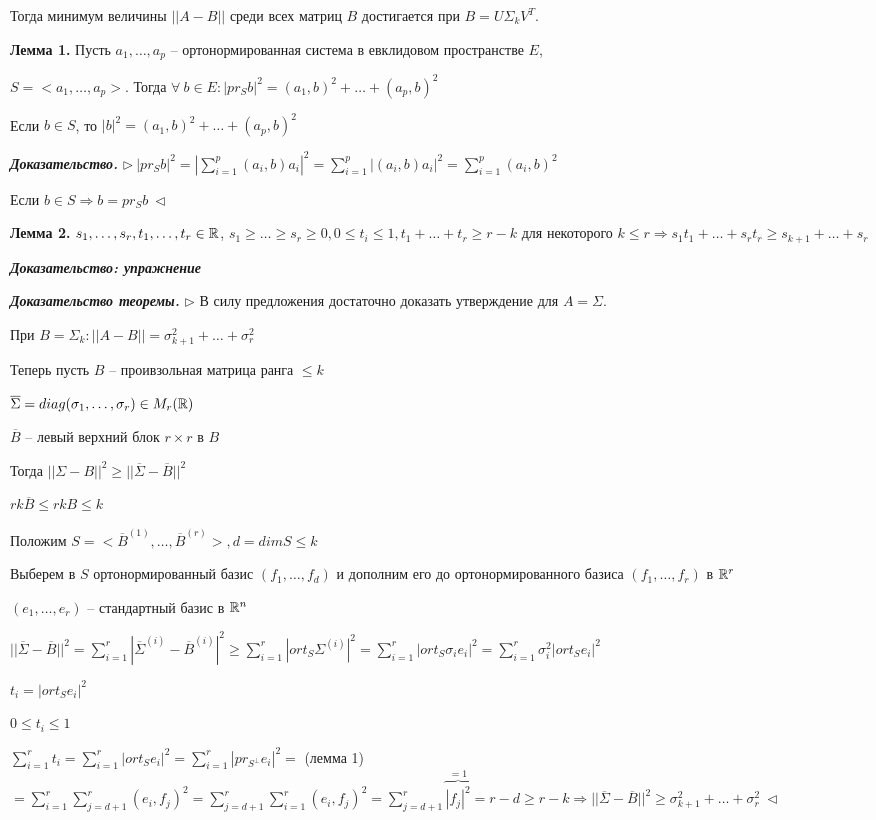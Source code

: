 Тогда минимум величины $||A - B||$ среди всех матриц $B$ достигается при $B = U \Sigma_k V^T$.

\bigskip
\textbf{Лемма 1.} Пусть $a_1, \dots, a_p$ -- ортонормированная система в евклидовом пространстве $E$,

$S = <a_1, \dots, a_p>$. Тогда $\forall \ b \in E: |pr_S b|^2 = (a_1, b)^2 + \dots + (a_p, b)^2$

Если $b \in S$, то $|b|^2 = (a_1, b)^2 + \dots + (a_p, b)^2$

\bigskip
\textbf{\textit{Доказательство.}} $\rhd \ |pr_S b|^2 = |\sum\limits_{i=1}^p (a_i, b) a_i|^2 = \sum\limits_{i=1}^p |(a_i, b) a_i|^2 = \sum\limits_{i=1}^p (a_i, b)^2$

Если $b \in S \Rightarrow b = pr_S b \ \lhd$

\bigskip
\textbf{Лемма 2.} $s_1, \dots, s_r, t_1, \dots, t_r \in \mathbb{R}$, $s_1 \geqslant \dots \geqslant s_r \geqslant 0, 0 \leqslant t_i \leqslant 1, t_1 + \dots + t_r \geqslant r - k$ для некоторого $k \leqslant r \Rightarrow s_1 t_1 + \dots + s_r t_r \geqslant s_{k+1} + \dots + s_r$

\bigskip
\textbf{\textit{Доказательство: упражнение}}

\bigskip
\textbf{\textit{Доказательство теоремы.}} $\rhd$ В силу предложения достаточно доказать утверждение для $A = \Sigma$.

При $B = \Sigma_k: ||A - B|| = \sigma_{k+1}^2 + \dots + \sigma_r^2$

\bigskip
Теперь пусть $B$ -- проивзольная матрица ранга $\leqslant k$

$\overline{\Sigma} = diag(\sigma_1, \dots, \sigma_r) \in M_r (\mathbb{R})$

$\overline{B}$ -- левый верхний блок $r \times r$ в $B$

\bigskip
Тогда $||\Sigma - B||^2 \geqslant ||\overline{\Sigma} - \overline{B}||^2$

$rk \overline{B} \leqslant rkB \leqslant k$

\bigskip
Положим $S = <\overline{B}^{(1)}, \dots, \overline{B}^{(r)}>, d = dimS \leqslant k$

Выберем в $S$ ортонормированный базис $(f_1, \dots, f_d)$ и дополним его до ортонормированного базиса $(f_1, \dots, f_r)$ в $\mathbb{R}^r$

$(e_1, \dots, e_r)$ -- стандартный базис в $\mathbb{R}^n$

\bigskip
$||\overline{\Sigma} - \overline{B}||^2 = \sum\limits_{i=1}^r |\overline{\Sigma}^{(i)} - \overline{B}^{(i)}|^2 \geqslant \sum\limits_{i=1}^r |ort_S \Sigma^{(i)}|^2 = \sum\limits_{i=1}^r |ort_S \sigma_i e_i|^2 = \sum\limits_{i=1}^r \sigma_i^2 |ort_S e_i|^2$

\bigskip
$t_i = |ort_S e_i|^2$

$0 \leqslant t_i \leqslant 1$

$\sum\limits_{i=1}^r t_i = \sum\limits_{i=1}^r |ort_S e_i|^2 = \sum\limits_{i=1}^r |pr_{S^{\bot}} e_i|^2 =$ (лемма 1) $ = \sum\limits_{i=1}^r \sum\limits_{j=d + 1}^r (e_i, f_j)^2 = \sum\limits_{j=d + 1}^r \sum\limits_{i=1}^r (e_i, f_j)^2 = \sum\limits_{j=d + 1}^r \overbrace{|f_j|^2}^{=1} = r - d \geqslant r - k \Rightarrow ||\overline{\Sigma} - \overline{B}||^2 \geqslant \sigma_{k+1}^2 + \dots + \sigma_r^2 \ \lhd$

